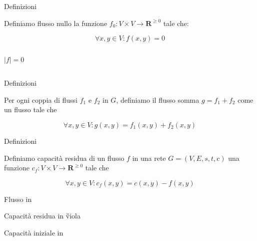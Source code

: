 \begin{frame}{Definizioni}

\vspace{-9pt}
\begin{myboxtitle}
Definiamo \alert{flusso nullo} la funzione 
$f_0: V \times V \rightarrow \mathbf{R}^{\geq 0}$ tale che:

\[
  \forall x,y \in V: f(x,y) = 0
\]
\end{myboxtitle}

\bigskip
\begin{columns}[T]
\[|f| = 0\]
\vspace{-12pt}
\end{columns}

\end{frame}


\begin{frame}{Definizioni}

\vspace{-9pt}
\begin{myboxtitle}
Per ogni coppia di flussi $f_1$ e $f_2$ in $G$, definiamo il \alert{flusso somma} $g = f_1+f_2$ come un flusso tale che 

\[
  \forall x,y \in V: g(x,y) = f_1(x,y) + f_2(x,y)
\]
\end{myboxtitle}


\end{frame}

\begin{frame}{Definizioni}

\vspace{-9pt}
\begin{myboxtitle}
Definiamo \alert{capacità residua} di un flusso $f$ in una rete $G=(V,E,s,t,c)$ 
una funzione $c_f: V \times V \rightarrow \mathbf{R}^{\geq 0}$
tale che 

\[
  \forall x,y \in V: c_f(x,y) = c(x,y) - f(x,y)
\]
\end{myboxtitle}

\smallskip
\begin{center}
\end{center}

\BI
\item Flusso in 
\item Capacità residua in \G{viola}
\item Capacità iniziale in 
\EI
\end{frame}

